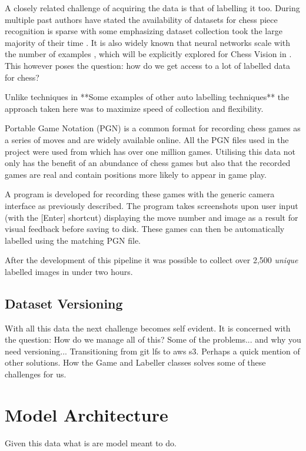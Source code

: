 A closely related challenge of acquiring the data is that of labelling it too. 
During  multiple past authors have stated the availability of 
datasets for chess piece recognition is sparse \cite{} with some emphasizing
dataset collection took the large majority of their time \cite{}.
It is also widely known that neural networks scale with the number of examples \cite{}, 
which will be explicitly explored for Chess Vision in .
This however poses the question: how do we get access to a lot of labelled data 
for chess?

Unlike techniques in \cite{}  **Some examples of other auto labelling techniques**
the approach taken here was to maximize speed of collection and flexibility.

Portable Game Notation (PGN) is a common format for recording chess games as a 
series of moves and are widely available online.  All the PGN files used in the 
project were used from \cite{} which has over one million games.  Utilising this
data not only has the benefit of an abundance of chess games but also that the 
recorded games are real and contain positions more likely to appear in game play. 

A program is developed for recording these games with the generic camera interface
as previously described.  The program takes screenshots upon user input (with the
[Enter] shortcut) displaying the move number and image as a result for visual feedback
before saving to disk.  These games can then be automatically labelled using the matching
PGN file.

After the development of this pipeline it was possible to collect over 2,500 \textit{unique} labelled
images in under two hours.

\subsection{Dataset Versioning}
With all this data the next challenge becomes self evident.
It is concerned with the question: How do we manage all of this?
Some of the problems... and why you need versioning...
Transitioning from git lfs to aws s3.  Perhaps a quick mention of other solutions.
How the Game and Labeller classes solves some of these challenges for us.


\section{Model Architecture}
Given this data what is are model meant to do.

